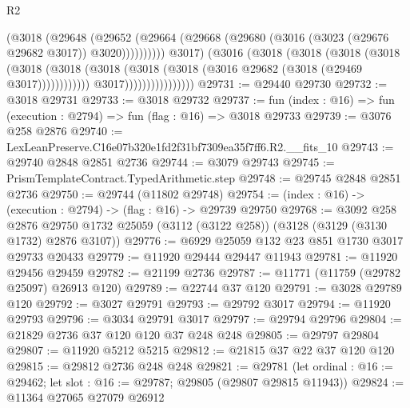 \begin{lexlean}{R2}
\begin{coremodule}
                                          (@3018
                                            (@29648
                                              (@29652
                                                (@29664
                                                  (@29668
                                                    (@29680
                                                      (@3016
                                                        (@3023 (@29676 @29682 @3017))
                                                        @3020))))))))))
                                    @3017)
                                  (@3016
                                    (@3018
                                      (@3018
                                        (@3018
                                          (@3018
                                            (@3018
                                              (@3018
                                                (@3018
                                                  (@3018
                                                    (@3018
                                                      (@3016 @29682 (@3018 (@29469 @3017))))))))))))
                                    @3017))))))))))))))))
@29731 := @29440 @29730
@29732 := @3018 @29731
@29733 := @3018 @29732
@29737 := fun (index : @16) => fun (execution : @2794) => fun (flag : @16) => @3018 @29733
@29739 := @3076 @258 @2876
@29740 := LexLeanPreserve.C16e07b320e1fd2f31bf7309ea35f7ff6.R2.__fits_10
@29743 := @29740 @2848 @2851 @2736
@29744 := @3079 @29743
@29745 := PrismTemplateContract.TypedArithmetic.step
@29748 := @29745 @2848 @2851 @2736
@29750 := @29744 (@11802 @29748)
@29754 := (index : @16) -> (execution : @2794) -> (flag : @16) -> @29739 @29750
@29768 := @3092
    @258
    @2876
    @29750
    @1732
    @25059
    (@3112 (@3122 @258))
    (@3128 (@3129 (@3130 @1732) @2876 @3107))
@29776 := @6929 @25059 @132 @23 @851 @1730 @3017 @29733 @20433
@29779 := @11920 @29444 @29447 @11943
@29781 := @11920 @29456 @29459
@29782 := @21199 @2736
@29787 := @11771 (@11759 (@29782 @25097) @26913 @120)
@29789 := @22744 @37 @120
@29791 := @3028 @29789 @120
@29792 := @3027 @29791
@29793 := @29792 @3017
@29794 := @11920 @29793
@29796 := @3034 @29791 @3017
@29797 := @29794 @29796
@29804 := @21829 @2736 @37 @120 @120 @37 @248 @248
@29805 := @29797 @29804
@29807 := @11920 @5212 @5215
@29812 := @21815 @37 @22 @37 @120 @120
@29815 := @29812 @2736 @248 @248
@29821 := @29781
    (let ordinal : @16 := @29462; let slot : @16 := @29787; @29805 (@29807 @29815 @11943))
@29824 := @11364 @27065 @27079 @26912

\end{coremodule}
\end{lexlean}
